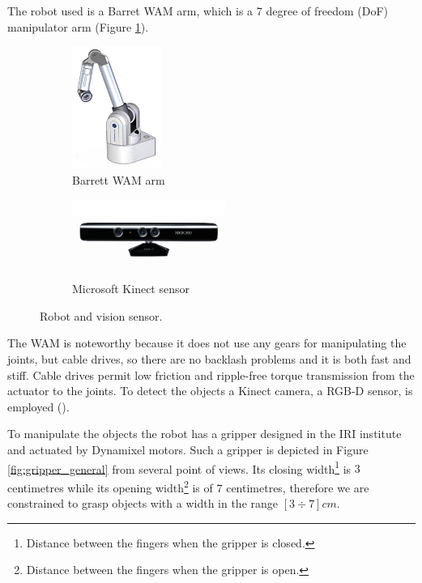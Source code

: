 The robot used is a Barret WAM arm, which is a 7 degree of freedom (DoF) manipulator arm (Figure \ref{fig:wam_1}). 
\begin{figure}[tb]
\centering
\begin{subfigure}[b]{0.45\textwidth}
\centering
\includegraphics[height=4cm]{Img/set_up/wam.jpg}
\caption{Barrett WAM arm}\label{fig:wam_1}
\end{subfigure}
\begin{subfigure}[b]{0.45\textwidth}
\centering
\includegraphics[width=5cm]{Img/set_up/Kinect.jpg}
\caption{Microsoft Kinect sensor}\label{fig:kinect}
\end{subfigure}
\caption{Robot and vision sensor.}
\end{figure}
The WAM is noteworthy because it does not use any gears for manipulating the joints, but cable drives, so there are no backlash problems and it is both fast and stiff. Cable drives permit low friction and ripple-free torque transmission from the actuator to the joints. 
To detect the objects a Kinect camera, a RGB-D sensor, is employed ().

To manipulate the objects the robot has a gripper designed in the IRI institute and actuated by Dynamixel motors. Such a gripper is depicted in Figure \ref{fig:gripper_general} from several point of views. Its closing width\footnote{Distance between the fingers when the gripper is closed.} is $3$ centimetres while its opening width\footnote{Distance between the fingers when the gripper is open.} is of $7$ centimetres, therefore we are constrained to grasp objects with a width in the range $[3 \div 7]cm$.

